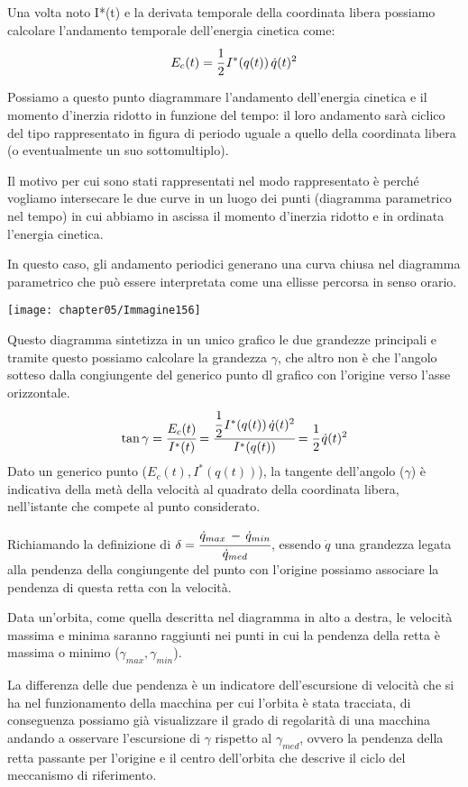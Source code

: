 Una volta noto I*(t) e la derivata temporale della coordinata libera possiamo calcolare l'andamento temporale dell'energia cinetica come:
\[E_c(t) = \cfrac{1}{2}\,I^*(q(t))\,\dot{q}(t)^2\]
\begin{minipage}{.5\textwidth}
Possiamo a questo punto diagrammare l'andamento dell'energia cinetica e il momento d'inerzia ridotto in funzione del tempo: il loro andamento sarà ciclico del tipo rappresentato in figura di periodo uguale a quello della coordinata libera (o eventualmente un suo sottomultiplo).

Il motivo per cui sono stati rappresentati nel modo rappresentato è perché vogliamo intersecare le due curve in un luogo dei punti (diagramma parametrico nel tempo) in cui abbiamo in ascissa il momento d'inerzia ridotto e in ordinata l'energia cinetica.

In questo caso, gli andamento periodici generano una curva chiusa nel diagramma parametrico che può essere interpretata come una ellisse percorsa in senso orario. 
\end{minipage}
\hfill
\begin{minipage}{.5\textwidth}
\centering
\texttt{[image: chapter05/Immagine156]}
\end{minipage}

Questo diagramma sintetizza in un unico grafico le due grandezze principali e tramite questo possiamo calcolare la grandezza $\gamma$, che altro non è che l'angolo sotteso dalla congiungente del generico punto dl grafico con l'origine verso l'asse orizzontale.
\[\tan{\gamma} = \cfrac{E_c(t)}{I^*(t)} = \cfrac{\cfrac{1}{2}\,I^*(q(t))\,\dot{q}(t)^2}{I^*(q(t))} = \cfrac{1}{2}\,\dot{q}(t)^2\]
Dato un generico punto ($E_c(t),I^*(q(t))$), la tangente dell'angolo ($\gamma$) è indicativa della metà della velocità al quadrato della coordinata libera, nell'istante che compete al punto considerato.

Richiamando la definizione di $\delta = \cfrac{\dot{q}_{max}\,-\,\dot{q}_{min}}{\dot{q}_{med}}$, essendo $\dot{q}$ una grandezza legata alla pendenza della congiungente del punto con l'origine possiamo associare la pendenza di questa retta con la velocità.

Data un'orbita, come quella descritta nel diagramma in alto a destra, le velocità massima e minima saranno raggiunti nei punti in cui la pendenza della retta è massima o minimo ($\gamma_{max},\gamma_{min}$).

La differenza delle due pendenza è un indicatore dell'escursione di velocità che si ha nel funzionamento della macchina per cui l'orbita è stata tracciata, di conseguenza possiamo già visualizzare il grado di regolarità di una macchina andando a osservare l'escursione di $\gamma$ rispetto al $\gamma_{med}$, ovvero la pendenza della retta passante per l'origine e il centro dell'orbita che descrive il ciclo del meccanismo di riferimento.

